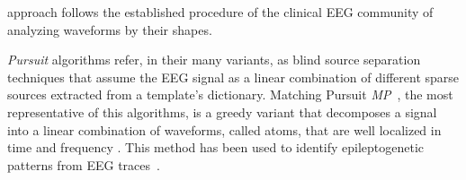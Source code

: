 approach follows the established procedure of the clinical EEG community of analyzing waveforms by their shapes.




%
%


%



\textit{Pursuit} algorithms refer, in their many variants, as blind source separation \cite{Vincent2010} techniques that assume the EEG signal as a linear combination of different sparse sources extracted from a template's dictionary.  Matching Pursuit \textit{MP}~\cite{Mallat1993}, the most representative of this algorithms, is a greedy variant that decomposes a signal into a linear combination of waveforms, called atoms, that are well localized in time and frequency \cite{ChandranKS2016}.  This method has been used to identify epileptogenetic patterns from EEG traces~\cite{Vareka2012}.

